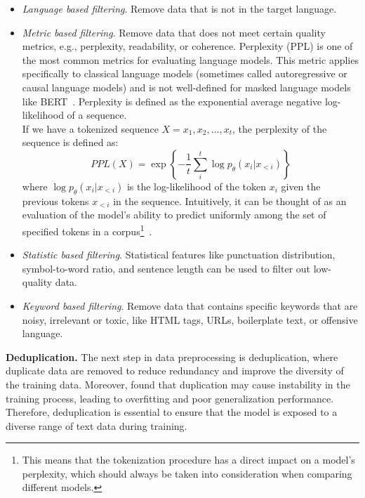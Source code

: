 \begin{itemize}
	\item \textit{Language based filtering}. {Remove data that is not in the target language.}
	\item \textit{Metric based filtering}. {Remove data that does not meet certain quality metrics, e.g., perplexity, readability, or coherence.
	      Perplexity (PPL) is one of the most common metrics for evaluating language models.
	      This metric applies specifically to classical language models (sometimes called autoregressive or causal language models) and is not well-defined for masked language models like BERT~\cite{devlin2019bert}.
	      Perplexity is defined as the exponential average negative log-likelihood of a sequence.\\
	      If we have a tokenized sequence \(X = x_1, x_2, \ldots, x_t\), the perplexity of the sequence is defined as:
	      \begin{equation}
		      PPL(X) = \exp \left\{ -\frac{1}{t} \sum_{i}^{t} \log p_{\theta}(x_i | x_{<i}) \right\}
		      \label{eq:equation_perplexity}
	      \end{equation}
	      where \(\log p_{\theta}(x_i | x_{<i})\) is the log-likelihood of the token \(x_i\) given the previous tokens \(x_{<i}\) in the sequence.
	      Intuitively, it can be thought of as an evaluation of the model’s ability to predict uniformly among the set of specified tokens in a corpus\footnote{This means that the tokenization procedure has a direct impact on a model’s perplexity, which should always be taken into consideration when comparing different models.}~\cite{huggingface2023perplexity}.
	      }
	\item \textit{Statistic based filtering}. {Statistical features like punctuation distribution, symbol-to-word ratio, and sentence length can be used to filter out low-quality data.
	      }
	\item \textit{Keyword based filtering}. {Remove data that contains specific keywords that are noisy, irrelevant or toxic, like HTML tags, URLs, boilerplate text, or offensive language.}
\end{itemize}

\textbf{Deduplication.}
The next step in data preprocessing is deduplication, where duplicate data are removed to reduce redundancy and improve the diversity of the training data.
Moreover, \textcite{hernandez2022scaling} found that duplication may cause instability in the training process, leading to overfitting and poor generalization performance.
Therefore, deduplication is essential to ensure that the model is exposed to a diverse range of text data during training.

